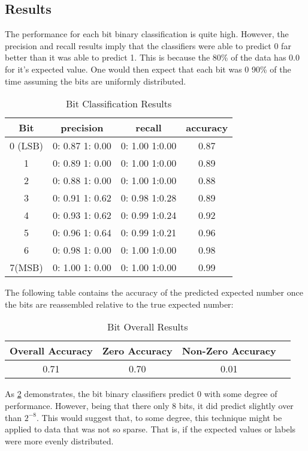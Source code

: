 \documentclass[pdftex,a4paper,12pt]{article}
\begin{document}
\subsection{Results}
The performance for each bit binary classification is quite high.  However, the precision and recall results imply that the classifiers were able to predict 0 far better than it was able to predict 1.  This is because the 80\% of the data has 0.0 for it's expected value.  One would then expect that each bit was $0$ 90\% of the time assuming the bits are uniformly distributed. 
\begin{table}[h]
{\centering
\begin{tabular}{|c|c|c|c|} \hline
	Bit 		&			precision				&		recall				&		accuracy			\\	\hline
0 (LSB)		&			0: 0.87	1: 0.00	&	0: 1.00	1:0.00	&		0.87	\\	\hline
1 				&			0: 0.89	1: 0.00	&	0: 1.00	1:0.00	&		0.89	\\	\hline
2 				&			0: 0.88	1: 0.00	&	0: 1.00	1:0.00	&		0.88	\\	\hline
3 				&			0: 0.91	1: 0.62	&	0: 0.98	1:0.28	&		0.89	\\	\hline
4 				&			0: 0.93	1: 0.62	&	0: 0.99	1:0.24	&		0.92	\\	\hline
5 				&			0: 0.96	1: 0.64	&	0: 0.99	1:0.21	&	  0.96	\\	\hline
6 				&			0: 0.98	1: 0.00	&	0: 1.00	1:0.00	&		0.98	\\	\hline
7(MSB) 		&			0: 1.00	1: 0.00	&	0: 1.00	1:0.00	&		0.99	\\	\hline
\end{tabular}
\caption{Bit Classification Results}          
\label{table:valresults}}
\end{table}

The following table contains the accuracy of the predicted expected number once the bits are reassembled relative to the true expected number:
\begin{table}[h]
{\centering 
\begin{tabular}{|c|c|c|c|} \hline
	Overall Accuracy 		&			Zero Accuracy				&		Non-Zero Accuracy		\\	\hline
		0.71							&					0.70						&				0.01					\\	\hline			
\end{tabular}
\caption{Bit Overall Results}          
\label{table:overallResults}}
\end{table}
As \ref{table:overallResults} demonstrates, the bit binary classifiers predict 0 with some degree of performance.   However, being that there only 8 bits, it did predict slightly over than $2^{-8}$.  This would suggest that, to some degree, this technique might be applied to data that was not so sparse.  That is, if the expected values or labels were more evenly distributed.  



\end{document}
